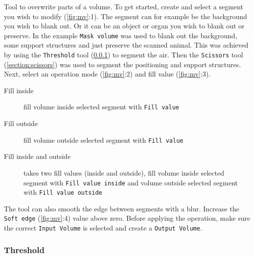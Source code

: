\noindent %
Tool to overwrite parts of a volume.
To get started, create and select a segment you wish to modify (\cref{fig:mv}:1).
The segment can for example be the background you wish to blank out.
Or it can be an object or organ you wish to blank out or preserve.
In the example  \texttt{Mask volume} was used to blank out the background, some support structures and just preserve the scanned animal.
This was achieved by using the \texttt{Threshold} tool (\cref{section:threshold}) to segment the air.
Then the \texttt{Scissors} tool (\cref{section:scissors}) was used to segment the positioning and support structures.
Next, select an operation mode (\cref{fig:mv}:2) and fill value (\cref{fig:mv}:3).
\begin{description}
	\item [Fill inside] fill volume inside selected segment with \texttt{Fill value}
	\item [Fill outside] fill volume outside selected segment with \texttt{Fill value}
	\item [Fill inside and outside] takes two fill values (inside and outside), fill volume inside selected segment with \texttt{Fill value inside} and volume outside selected segment with \texttt{Fill value outside}
\end{description}
The tool can also smooth the edge between segments with a blur. Increase the \texttt{Soft edge} (\cref{fig:mv}:4) value above zero.
Before applying the operation, make sure the correct \texttt{Input Volume} is selected and create a \texttt{Output Volume}.


\pagebreak
\subsubsection{Threshold}\label{section:threshold}
\begin{figure}[h]
	\begin{subfigure}{0.2\textwidth}
		
	\end{subfigure}
\end{figure}


